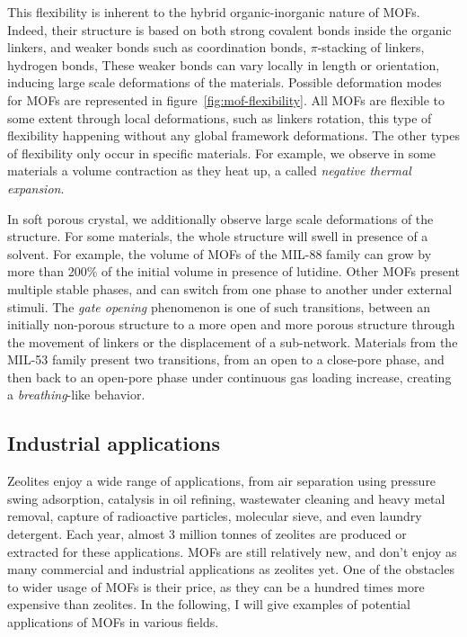 \documentclass[thesis]{subfiles}
\begin{document}
This flexibility is inherent to the hybrid organic-inorganic nature of MOFs.
Indeed, their structure is based on both strong covalent bonds inside the
organic linkers, and weaker bonds such as coordination bonds, $\pi$-stacking of
linkers, hydrogen bonds, \etc These weaker bonds can vary locally in length or
orientation, inducing large scale deformations of the materials. Possible
deformation modes for MOFs are represented in figure~\ref{fig:mof-flexibility}.
All MOFs are flexible to some extent through local deformations, such as linkers
rotation, this type of flexibility happening without any global framework
deformations. The other types of flexibility only occur in specific materials.
For example, we observe in some materials a volume contraction as they heat
up, \ie a called \emph{negative thermal expansion}\cite{Dubbeldam2007}.

In soft porous crystal, we additionally observe large scale deformations of the
structure. For some materials, the whole structure will swell in presence of a
solvent. For example, the volume of MOFs of the MIL-88 family can grow by more
than 200\% of the initial volume in presence of lutidine\cite{Serre2007}. Other
MOFs present multiple stable phases, and can switch from one phase to another
under external stimuli. The \emph{gate opening} phenomenon is one of such
transitions, between an initially non-porous structure to a more open and more
porous structure through the movement of linkers or the displacement of a
sub-network. Materials from the MIL-53 family present two transitions, from an
open to a close-pore phase, and then back to an open-pore phase\cite{Serre2002}
under continuous gas loading increase, creating a \emph{breathing}-like
behavior.

\subsection{Industrial applications}

Zeolites enjoy a wide range of applications, from air separation using pressure
swing adsorption\cite{Rege1997}, catalysis in oil refining\cite{Primo2014},
wastewater cleaning and heavy metal removal\cite{Curkovi1997}, capture of
radioactive particles\cite{Borai2009}, molecular sieve\cite{Flanigen1978}, and
even laundry detergent\cite{Karge1989}. Each year, almost 3 million tonnes of
zeolites are produced or extracted for these applications. MOFs are still
relatively new, and don't enjoy as many commercial and industrial applications
as zeolites yet. One of the obstacles to wider usage of MOFs is their price,
as they can be a hundred times more expensive than zeolites. In the following, I
will give examples of potential applications of MOFs in various fields.
\end{document}
